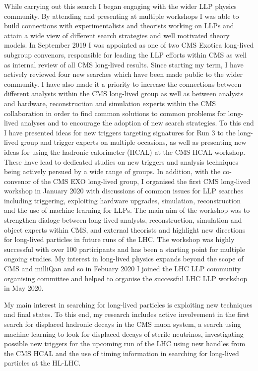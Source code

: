 \documentclass[11pt]{article}
\theoremstyle{plain} \numberwithin{equation}{section}
\theoremstyle{definition}
\newcounter{list}
\begin{document}
While carrying out this search I began engaging with the wider LLP physics community. 
By attending and presenting at multiple workshops I was able to build connections with 
experimentalists and theorists working on LLPs and attain a wide view of different 
search strategies and well motivated theory models. In September 2019 I was appointed as
one of two CMS Exotica long-lived subgroup convenors, responsible for leading the 
LLP efforts within CMS as well as internal review of all CMS long-lived results. Since starting
my term, I have actively reviewed four new searches which have been made public to the wider community.
I have also made it a priority to increase the connections between different analysts within the
CMS long-lived group as well as between analysts and hardware, reconstruction 
and simulation experts within the CMS collaboration in order to find common solutions to 
common problems for long-lived analyses and to encourage the
adoption of new search strategies. To this end I have presented ideas for 
new triggers targeting signatures for Run 3 to the long-lived group 
and trigger experts on multiple occasions, as well as
presenting new ideas for using the hadronic calorimeter (HCAL) at the CMS HCAL workshop.
These have lead to dedicated studies on new triggers and analysis techniques being actively persued 
by a wide range of groups. In addition, with the co-convenor of the CMS EXO long-lived group, I 
organised the first CMS long-lived workshop in January 2020 with discussions 
of common issues for LLP searches including triggering, exploiting hardware upgrades, 
simulation, reconstruction and the use of machine learning for LLPs. 
The main aim of the workshop was to strengthen dialoge between long-lived analysts, 
reconstruction, simulation and object experts within CMS, and external theorists and
highlight new directions for long-lived particles in future runs of the LHC.  
The workshop was highly successful with over 100 participants and has been a starting 
point for multiple ongoing studies. My interest in long-lived physics expands beyond the scope of CMS
and milliQan and so in Febuary 2020 I joined the LHC LLP community organising committee 
and helped to organise the successful LHC LLP workshop in May 2020.

My main interest in searching for long-lived particles is exploiting new techniques and final states.
To this end, my research includes active involvement in the first search for displaced
hadronic decays in the CMS muon system, a search using machine learning to look for 
displaced decays of sterile neutrinos, investigating possible new triggers
for the upcoming run of the LHC using new handles from the CMS HCAL and the use
of timing information in searching for long-lived particles at the HL-LHC.
\end{document}
